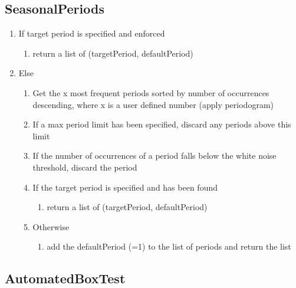 \subsection{SeasonalPeriods}

	\begin{enumerate}
		\item If target period is specified and enforced
		
		\begin{enumerate}
			\item return a list of (targetPeriod, defaultPeriod) 
		\end{enumerate}
		
		\item Else 
		
		\begin{enumerate}
			\item Get the x most frequent periods sorted by number of occurrences descending, where x is a user defined number (apply periodogram)
			\item If a max period limit has been specified, discard any periods above this limit
			\item If the number of occurrences of a period falls below the white noise threshold, discard the period
			
			\item If the target period is specified and has been found
			
			\begin{enumerate}
				\item return a list of (targetPeriod, defaultPeriod) 
			\end{enumerate}
			
			\item Otherwise
			
			\begin{enumerate}
				\item add the defaultPeriod (=1) to the list of periods and return the list
			\end{enumerate}
		\end{enumerate}
	\end{enumerate}


\subsection{AutomatedBoxTest}

